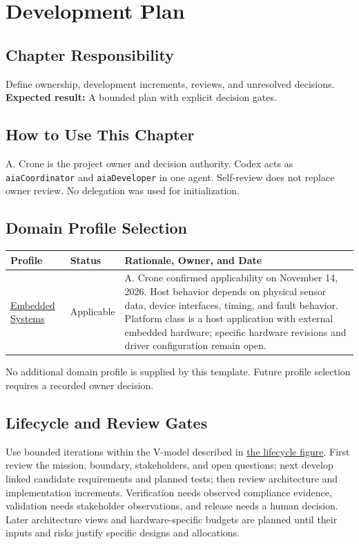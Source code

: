 \chapter{Development Plan}
\section{Chapter Responsibility}
\label{Section:DevelopmentPlanResponsibility}
Define ownership, development increments, reviews, and unresolved decisions.
\noindent\textbf{Expected result:} A bounded plan with explicit decision gates.

\section{How to Use This Chapter}
A. Crone is the project owner and decision authority. Codex acts as
\texttt{aiaCoordinator} and \texttt{aiaDeveloper} in one agent. Self-review
does not replace owner review. No delegation was used for initialization.

\section{Domain Profile Selection}
\label{Section:DevelopmentPlanProfiles}
\begin{tabularx}{\linewidth}{L{3cm}L{2cm}Y}
\caption{Project Domain Profile Decisions\label{Table:ProjectDomainProfiles}}\\
\toprule Profile & Status & Rationale, Owner, and Date\\\midrule
\hyperref[Chapter:EmbeddedSystemsProfile]{Embedded Systems} & Applicable &
A. Crone confirmed applicability on November 14, 2026. Host behavior depends
on physical sensor data, device interfaces, timing, and fault behavior.
Platform class is a host application with external embedded hardware;
specific hardware revisions and driver configuration remain open.\\
\bottomrule
\end{tabularx}
No additional domain profile is supplied by this template. Future profile
selection requires a recorded owner decision.

\section{Lifecycle and Review Gates}
Use bounded iterations within the V-model described in
\hyperref[Figure:VModel]{the lifecycle figure}. First review the mission,
boundary, stakeholders, and open questions; next develop linked candidate
requirements and planned tests; then review architecture and implementation
increments. Verification needs observed compliance evidence, validation
needs stakeholder observations, and release needs a human decision.
Later architecture views and hardware-specific budgets are planned until
their inputs and risks justify specific designs and allocations.

